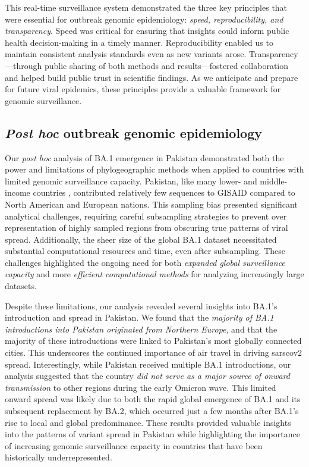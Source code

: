 This real-time surveillance system demonstrated the three key principles that were essential for outbreak genomic epidemiology: \textit{speed, reproducibility, and transparency}.
Speed was critical for ensuring that insights could inform public health decision-making in a timely manner.
Reproducibility enabled us to maintain consistent analysis standards even as new variants arose.
Transparency---through public sharing of both methods and results---fostered collaboration and helped build public trust in scientific findings.
As we anticipate and prepare for future viral epidemics, these principles provide a valuable framework for genomic surveillance.

\subsection{\textit{Post hoc} outbreak genomic epidemiology}
Our \textit{post hoc} analysis of BA.1 emergence in Pakistan demonstrated both the power and limitations of phylogeographic methods when applied to countries with limited genomic surveillance capacity.
Pakistan, like many lower- and middle-income countries \citep{brito2022global}, contributed relatively few sequences to GISAID compared to North American and European nations.
This sampling bias presented significant analytical challenges, requiring careful subsampling strategies to prevent over representation of highly sampled regions from obscuring true patterns of viral spread.
Additionally, the sheer size of the global BA.1 dataset necessitated substantial computational resources and time, even after subsampling.
These challenges highlighted the ongoing need for both \textit{expanded global surveillance capacity} and more \textit{efficient computational methods} for analyzing increasingly large datasets.

Despite these limitations, our analysis revealed several insights into BA.1's introduction and spread in Pakistan.
We found that the \textit{majority of BA.1 introductions into Pakistan originated from Northern Europe}, and that the majority of these introductions were linked to Pakistan's most globally connected cities.
This underscores the continued importance of air travel in driving \gls{sarscov2} spread.
Interestingly, while Pakistan received multiple BA.1 introductions, our analysis suggested that the country \textit{did not serve as a major source of onward transmission} to other regions during the early Omicron wave.
This limited onward spread was likely due to both the rapid global emergence of BA.1 and its subsequent replacement by BA.2, which occurred just a few months after BA.1's rise to local and global predominance.
These results provided valuable insights into the patterns of variant spread in Pakistan while highlighting the importance of increasing genomic surveillance capacity in countries that have been historically underrepresented.

